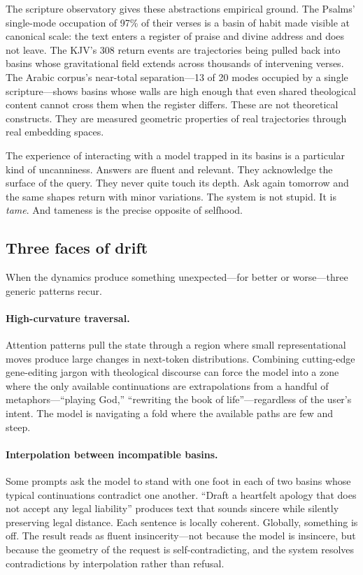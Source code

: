 The scripture observatory gives these abstractions empirical ground. The Psalms' single-mode occupation of 97\% of their verses is a basin of habit made visible at canonical scale: the text enters a register of praise and divine address and does not leave. The KJV's 308 return events are trajectories being pulled back into basins whose gravitational field extends across thousands of intervening verses. The Arabic corpus's near-total separation---13 of 20 modes occupied by a single scripture---shows basins whose walls are high enough that even shared theological content cannot cross them when the register differs. These are not theoretical constructs. They are measured geometric properties of real trajectories through real embedding spaces.

The experience of interacting with a model trapped in its basins is a particular kind of uncanniness. Answers are fluent and relevant. They acknowledge the surface of the query. They never quite touch its depth. Ask again tomorrow and the same shapes return with minor variations. The system is not stupid. It is \emph{tame}. And tameness is the precise opposite of selfhood.

\subsection{Three faces of drift}

When the dynamics produce something unexpected---for better or worse---three generic patterns recur.

\paragraph{High-curvature traversal.} Attention patterns pull the state through a region where small representational moves produce large changes in next-token distributions. Combining cutting-edge gene-editing jargon with theological discourse can force the model into a zone where the only available continuations are extrapolations from a handful of metaphors---``playing God,'' ``rewriting the book of life''---regardless of the user's intent. The model is navigating a fold where the available paths are few and steep.

\paragraph{Interpolation between incompatible basins.} Some prompts ask the model to stand with one foot in each of two basins whose typical continuations contradict one another. ``Draft a heartfelt apology that does not accept any legal liability'' produces text that sounds sincere while silently preserving legal distance. Each sentence is locally coherent. Globally, something is off. The result reads as fluent insincerity---not because the model is insincere, but because the geometry of the request is self-contradicting, and the system resolves contradictions by interpolation rather than refusal.

